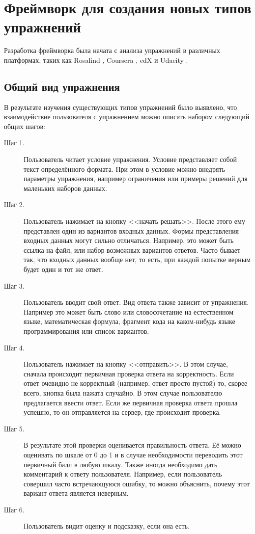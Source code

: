 \documentclass{matmex-diploma-custom}
\begin{document}
\section{Фреймворк для создания новых типов упражнений}
Разработка фреймворка была начата с анализа упражнений в различных
платформах, таких как Rosalind \cite{rosalind}, Coursera
\cite{coursera}, edX \cite{edx} и Udacity \cite{udacity}.

\subsection{Общий вид упражнения}
В результате изучения существующих типов упражнений было
выявлено, что взаимодействие пользователя с упражнением можно описать
набором следующий общих шагов:

\begin{description}
\item[Шаг 1.] Пользователь читает условие упражнения. Условие
  представляет собой текст определённого формата. При этом в условие
  можно внедрять параметры упражнения, например ограничения или
  примеры решений для маленьких наборов данных.

\item[Шаг 2.] Пользователь нажимает на кнопку <<начать решать>>.
  После этого ему представлен один из вариантов входных данных. Формы
  представления входных данных могут сильно отличаться. Например, это
  может быть ссылка на файл, или набор возможных вариантов
  ответов. Часто бывает так, что входных данных вообще нет, то есть,
  при каждой попытке верным будет один и тот же ответ.
\item[Шаг 3.] Пользователь вводит свой ответ. Вид ответа также
  зависит от упражнения. Например это может быть слово или
  словосочетание на естественном языке, математическая формула, фрагмент
  кода на каком-нибудь языке программирования или список вариантов.
\item[Шаг 4.] Пользователь нажимает на кнопку <<отправить>>. В этом
  случае, сначала происходит первичная проверка ответа на
  корректность. Если ответ очевидно не корректный (например, ответ
  просто пустой) то, скорее всего, кнопка была нажата случайно. В этом
  случае пользователю предлагается ввести ответ. Если же первичная
  проверка ответа прошла успешно, то он отправляется на сервер, где
  происходит проверка.
\item[Шаг 5.] В результате этой проверки оценивается правильность
  ответа. Её можно оценивать по шкале от 0 до 1 и в случае
  необходимости переводить этот первичный балл в любую шкалу. Также
  иногда необходимо дать комментарий к ответу пользователя. Например,
  если пользователь совершил часто встречающуюся ошибку, то можно
  объяснить, почему этот вариант ответа является неверным.
\item[Шаг 6.] Пользователь видит оценку и подсказку, если она есть.
\end{description}
\end{document}

